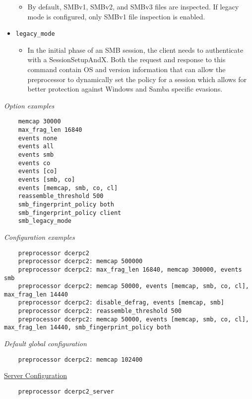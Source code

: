 \documentclass[english]{report}
\begin{document}
\begin{itemize}
\begin{itemize}
\item[]  By default, SMBv1, SMBv2, and SMBv3 files are inspected. 
        If legacy mode is configured, only SMBv1 file inspection is enabled. 


\end{itemize}

\item[] \texttt{legacy\_mode}
\begin{itemize}

\item[] In the initial phase of an SMB session, the client needs to authenticate
with a SessionSetupAndX.  Both the request and response to this command
contain OS and version information that can allow the preprocessor to
dynamically set the policy for a session which allows for better
protection against Windows and Samba specific evasions.

\end{itemize}
\end{itemize}

\textit{Option examples}
\footnotesize
\begin{verbatim}
    memcap 30000
    max_frag_len 16840
    events none
    events all
    events smb
    events co
    events [co]
    events [smb, co]
    events [memcap, smb, co, cl]
    reassemble_threshold 500
    smb_fingerprint_policy both
    smb_fingerprint_policy client
    smb_legacy_mode
\end{verbatim}
\normalsize

\textit{Configuration examples}
\footnotesize
\begin{verbatim}
    preprocessor dcerpc2
    preprocessor dcerpc2: memcap 500000
    preprocessor dcerpc2: max_frag_len 16840, memcap 300000, events smb
    preprocessor dcerpc2: memcap 50000, events [memcap, smb, co, cl], max_frag_len 14440
    preprocessor dcerpc2: disable_defrag, events [memcap, smb]
    preprocessor dcerpc2: reassemble_threshold 500
    preprocessor dcerpc2: memcap 50000, events [memcap, smb, co, cl], max_frag_len 14440, smb_fingerprint_policy both
\end{verbatim}
\normalsize

\textit{Default global configuration}
\footnotesize
\begin{verbatim}
    preprocessor dcerpc2: memcap 102400
\end{verbatim}
\normalsize

\underline{Server Configuration}

\begin{verbatim}
    preprocessor dcerpc2_server
\end{verbatim}
\end{document}
